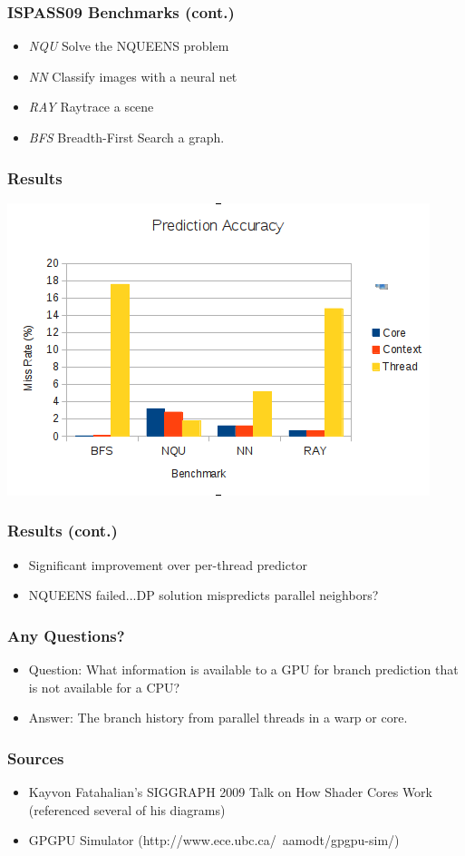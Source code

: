 \documentclass{beamer}
\begin{document}
\begin{frame}
 \frametitle{ISPASS09 Benchmarks (cont.)}
\begin{itemize}
 \item<1-> \emph{NQU} Solve the NQUEENS problem
 \item<2-> \emph{NN} Classify images with a neural net
  \item<3-> \emph{RAY} Raytrace a scene
\item<4-> \emph{BFS} Breadth-First Search a graph.
\end{itemize}
\end{frame}

\begin{frame}
\frametitle{Results}
\includegraphics[width=.9\textwidth]{data.png}
\end{frame}

\begin{frame}
 \frametitle{Results (cont.)}
\begin{itemize}
 \item<1-> Significant improvement over per-thread predictor
 \item<2-> NQUEENS failed...DP solution mispredicts parallel neighbors?
\end{itemize}

\end{frame}

\begin{frame}
 \frametitle{Any Questions?}
\begin{itemize}
 \item<1-> Question: What information is available to a GPU for branch prediction that is not available for a CPU?
 \item<2-> Answer: The branch history from parallel threads in a warp or core.
\end{itemize}

\end{frame}


\begin{frame}
	\frametitle{Sources}
	\begin{itemize}
		\item Kayvon Fatahalian's SIGGRAPH 2009 Talk on How Shader Cores Work (referenced several of his diagrams)
		\item GPGPU Simulator (http://www.ece.ubc.ca/~aamodt/gpgpu-sim/)
	\end{itemize}
\end{frame}
\end{document}
